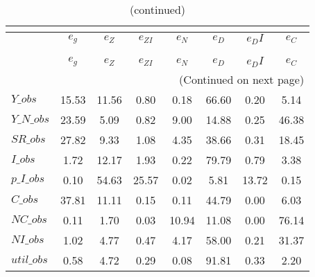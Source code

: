  
\begin{center}
\begin{longtable}{lccccccc} 
\caption{VARIANCE DECOMPOSITION (in percent)}\\
 \label{Table:th_var_decomp_uncond}\\
\toprule 
$           $	 & 	 $       {e_g}$	 & 	 $       {e_Z}$	 & 	 $    {e_{ZI}}$	 & 	 $       {e_N}$	 & 	 $       {e_D}$	 & 	 $      {e_DI}$	 & 	 $       {e_C}$\\
\midrule \endfirsthead 
\caption{(continued)}\\
 \toprule \\ 
$           $	 & 	 $       {e_g}$	 & 	 $       {e_Z}$	 & 	 $    {e_{ZI}}$	 & 	 $       {e_N}$	 & 	 $       {e_D}$	 & 	 $      {e_DI}$	 & 	 $       {e_C}$\\
\midrule \endhead 
\midrule \multicolumn{8}{r}{(Continued on next page)} \\ \bottomrule \endfoot 
\bottomrule \endlastfoot 
$Y\_obs     $	 & 	       15.53	 & 	       11.56	 & 	        0.80	 & 	        0.18	 & 	       66.60	 & 	        0.20	 & 	        5.14 \\ 
$Y\_N\_obs  $	 & 	       23.59	 & 	        5.09	 & 	        0.82	 & 	        9.00	 & 	       14.88	 & 	        0.25	 & 	       46.38 \\ 
$SR\_obs    $	 & 	       27.82	 & 	        9.33	 & 	        1.08	 & 	        4.35	 & 	       38.66	 & 	        0.31	 & 	       18.45 \\ 
$I\_obs     $	 & 	        1.72	 & 	       12.17	 & 	        1.93	 & 	        0.22	 & 	       79.79	 & 	        0.79	 & 	        3.38 \\ 
$p\_I\_obs  $	 & 	        0.10	 & 	       54.63	 & 	       25.57	 & 	        0.02	 & 	        5.81	 & 	       13.72	 & 	        0.15 \\ 
$C\_obs     $	 & 	       37.81	 & 	       11.11	 & 	        0.15	 & 	        0.11	 & 	       44.79	 & 	        0.00	 & 	        6.03 \\ 
$NC\_obs    $	 & 	        0.11	 & 	        1.70	 & 	        0.03	 & 	       10.94	 & 	       11.08	 & 	        0.00	 & 	       76.14 \\ 
$NI\_obs    $	 & 	        1.02	 & 	        4.77	 & 	        0.47	 & 	        4.17	 & 	       58.00	 & 	        0.21	 & 	       31.37 \\ 
$util\_obs  $	 & 	        0.58	 & 	        4.72	 & 	        0.29	 & 	        0.08	 & 	       91.81	 & 	        0.33	 & 	        2.20 \\ 

\end{longtable}
\end{center}
